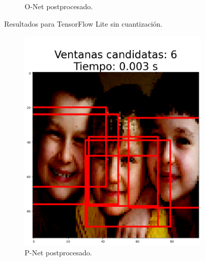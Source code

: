 \begin{figure}[!htpb]
\begin{subfigure}[b]{0.28\textwidth}
         \caption{O-Net postprocesado.}
         \label{fig:2de3}
     \end{subfigure}
     \hfill
        \caption{Resultados para TensorFlow Lite sin cuantización.}
        \label{fig:test_tf_rnet}
\end{figure}

\begin{figure}[!htpb]
     \centering
     \begin{subfigure}[b]{0.28\textwidth}
         \centering
         \includegraphics[width=\textwidth]{./Figures/test_tf_pnet_c.png}
         \caption{P-Net postprocesado.}
         \label{fig:1de3}
     \end{subfigure}
     \hfill
     \begin{subfigure}[b]{0.28\textwidth}
         \centering

\end{subfigure}
\end{figure}
